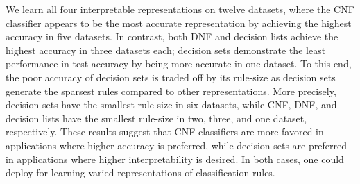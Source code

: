 We learn all four interpretable representations on twelve datasets, where the CNF classifier appears to be the most accurate representation by achieving the highest accuracy in five datasets. In contrast, both DNF and decision lists achieve the highest accuracy in three datasets each; decision sets demonstrate the least performance in test accuracy by being more accurate in one dataset. To this end, the poor accuracy of decision sets is traded off by its rule-size as decision sets generate the sparsest rules compared to other representations. More precisely, decision sets have the smallest rule-size in six datasets, while CNF, DNF, and decision lists have the smallest rule-size in two, three, and one dataset, respectively. These results suggest that CNF classifiers are more favored in applications where higher accuracy is preferred, while decision sets are preferred in applications where higher interpretability is desired. In both cases, one could deploy {\imli} for learning varied representations of classification rules. 




